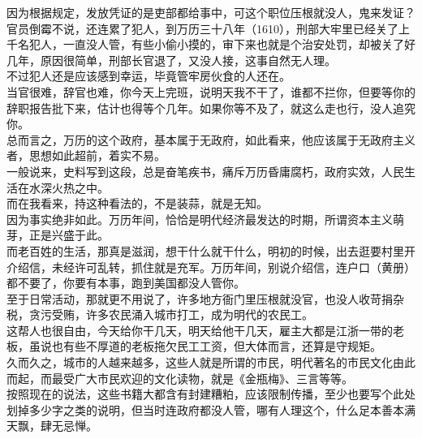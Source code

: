 \begin{multicols}{\theparacolNo}
因为根据规定，发放凭证的是吏部都给事中，可这个职位压根就没人，鬼来发证？\\

官员倒霉不说，还连累了犯人，到万历三十八年（1610），刑部大牢里已经关了上千名犯人，一直没人管，有些小偷小摸的，审下来也就是个治安处罚，却被关了好几年，原因很简单，刑部长官退了，又没人接，这事自然无人理。\\

不过犯人还是应该感到幸运，毕竟管牢房伙食的人还在。\\

当官很难，辞官也难，你今天上完班，说明天我不干了，谁都不拦你，但要等你的辞职报告批下来，估计也得等个几年。如果你等不及了，就这么走也行，没人追究你。\\

总而言之，万历的这个政府，基本属于无政府，如此看来，他应该属于无政府主义者，思想如此超前，着实不易。\\

一般说来，史料写到这段，总是奋笔疾书，痛斥万历昏庸腐朽，政府实效，人民生活在水深火热之中。\\

而在我看来，持这种看法的，不是装蒜，就是无知。\\

因为事实绝非如此。万历年间，恰恰是明代经济最发达的时期，所谓资本主义萌芽，正是兴盛于此。\\

而老百姓的生活，那真是滋润，想干什么就干什么，明初的时候，出去逛要村里开介绍信，未经许可乱转，抓住就是充军。万历年间，别说介绍信，连户口（黄册）都不要了，你要有本事，跑到美国都没人管你。\\

至于日常活动，那就更不用说了，许多地方衙门里压根就没官，也没人收苛捐杂税，贪污受贿，许多农民涌入城市打工，成为明代的农民工。\\

这帮人也很自由，今天给你干几天，明天给他干几天，雇主大都是江浙一带的老板，虽说也有些不厚道的老板拖欠民工工资，但大体而言，还算是守规矩。\\

久而久之，城市的人越来越多，这些人就是所谓的市民，明代著名的市民文化由此而起，而最受广大市民欢迎的文化读物，就是《金瓶梅》、三言等等。\\

按照现在的说法，这些书籍大都含有封建糟粕，应该限制传播，至少也要写个此处划掉多少字之类的说明，但当时连政府都没人管，哪有人理这个，什么足本善本满天飘，肆无忌惮。\\


\end{multicols}
